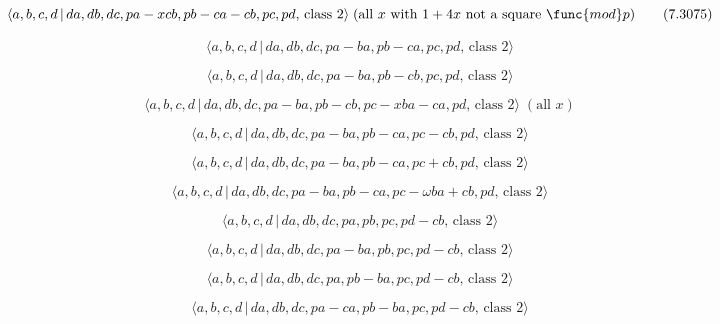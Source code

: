 \documentclass[10pt]{article}
\begin{document}
\begin{equation}
\langle a,b,c,d\,|\,da,db,dc,pa-xcb,pb-ca-cb,pc,pd,\,\text{class }2\rangle
\;(\text{all }x\text{ with }1+4x\text{ not a square }\func{mod}p) 
\tag{7.3075}
\end{equation}

\begin{equation}
\langle a,b,c,d\,|\,da,db,dc,pa-ba,pb-ca,pc,pd,\,\text{class }2\rangle 
\tag{7.3076}
\end{equation}

\begin{equation}
\langle a,b,c,d\,|\,da,db,dc,pa-ba,pb-cb,pc,pd,\,\text{class }2\rangle 
\tag{7.3077}
\end{equation}

\begin{equation}
\langle a,b,c,d\,|\,da,db,dc,pa-ba,pb-cb,pc-xba-ca,pd,\,\text{class }%
2\rangle \;(\text{all }x)  \tag{7.3078}
\end{equation}

\begin{equation}
\langle a,b,c,d\,|\,da,db,dc,pa-ba,pb-ca,pc-cb,pd,\,\text{class }2\rangle 
\tag{7.3079}
\end{equation}

\begin{equation}
\langle a,b,c,d\,|\,da,db,dc,pa-ba,pb-ca,pc+cb,pd,\,\text{class }2\rangle 
\tag{7.3080}
\end{equation}

\begin{equation}
\langle a,b,c,d\,|\,da,db,dc,pa-ba,pb-ca,pc-\omega ba+cb,pd,\,\text{class }%
2\rangle  \tag{7.3081}
\end{equation}

\begin{equation}
\langle a,b,c,d\,|\,da,db,dc,pa,pb,pc,pd-cb,\,\text{class }2\rangle 
\tag{7.3082}
\end{equation}

\begin{equation}
\langle a,b,c,d\,|\,da,db,dc,pa-ba,pb,pc,pd-cb,\,\text{class }2\rangle 
\tag{7.3083}
\end{equation}

\begin{equation}
\langle a,b,c,d\,|\,da,db,dc,pa,pb-ba,pc,pd-cb,\,\text{class }2\rangle 
\tag{7.3084}
\end{equation}

\begin{equation}
\langle a,b,c,d\,|\,da,db,dc,pa-ca,pb-ba,pc,pd-cb,\,\text{class }2\rangle 
\tag{7.3085}
\end{equation}
\end{document}
